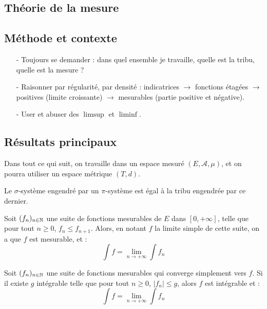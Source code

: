 \documentclass[11pt,a4paper]{article}
\begin{document}
\newpage
\begin{center}
\section*{Théorie de la mesure} 
\end{center}


\subsection*{Méthode et contexte}

\begin{itemize}
\item[-] Toujours se demander : dans quel ensemble je travaille, quelle est la tribu, quelle est la mesure ? 
\item[-] Raisonner par régularité, par densité : indicatrices $\rightarrow$ fonctions étagées $\rightarrow$ positives (limite croissante) $\rightarrow$ mesurables (partie positive et négative).
\item[-] User et abuser des $\limsup$ et $\liminf$.
\end{itemize}

\subsection*{Résultats principaux}
Dans tout ce qui suit, on travaille dans un espace mesuré $(E,\mathcal{A},\mu)$, et on pourra utiliser un espace métrique $(T,d)$.


\begin{thmstar}[Dynkin] 
Le $\sigma$-système engendré par un $\pi$-système est égal à la tribu engendrée par ce dernier.
\end{thmstar}


\begin{thmstar}
Soit $(f_n)_{n\in\mathbb N}$ une suite de fonctions mesurables de $E$ dans $[0,+\infty]$, telle que pour tout $n\geq 0$, $f_n \leq f_{n+1}  $. Alors, en notant $f$ la limite simple de cette suite, on a que $f$ est mesurable, et : 
\[\int f = \lim\limits_{n \to +\infty} \int f_n \]
\end{thmstar}


\begin{thmstar}
Soit $(f_n)_{n\in\mathbb N}$ une suite de fonctions mesurables qui converge simplement vers $f$. Si il existe $g$ intégrable telle que pour tout $n \geq 0$, $\left| f_n \right| \leq g$, alors $f$ est intégrable et :
\[\int f = \lim\limits_{n \to +\infty} \int f_n \]
\end{thmstar}
\end{document}
